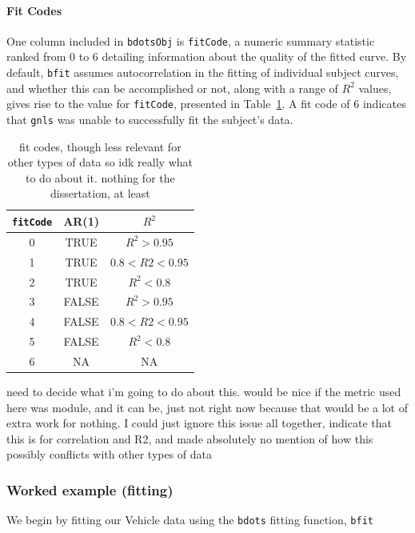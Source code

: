 \documentclass{article}
\newcommand{\xt}{\texttt}%
\begin{document}
\paragraph{Fit Codes}

One column included in \xt{bdotsObj} is \xt{fitCode}, a numeric summary statistic ranked from 0 to 6 detailing information about the quality of the fitted curve. By default, \xt{bfit} assumes autocorrelation in the fitting of individual subject curves, and whether this can be accomplished or not, along with a range of $R^2$ values, gives rise to the value for \xt{fitCode}, presented in Table~\ref{tab:fit_codes}. A fit code of 6 indicates that \xt{gnls} was unable to successfully fit the subject's data. 

\begin{table}[h]
\centering
\def\arraystretch{1.5}
\begin{tabular}{|c|c|c|}
\hline
\xt{fitCode} & AR(1) & $R^2$ \\
\hline
0 & TRUE & $R^2 > 0.95$ \\
1 & TRUE & $0.8 < R2 < 0.95$ \\
2 & TRUE & $ R^2 <0.8$ \\
3 & FALSE & $R^2 >0.95$ \\
4 & FALSE & $0.8 < R2 < 0.95$ \\
5 & FALSE &$ R^2 <0.8$  \\
6 & NA & NA \\
\hline
\end{tabular}
\caption{fit codes, though less relevant for other types of data so idk really what to do about it. nothing for the dissertation, at least}
\label{tab:fit_codes}
\end{table}



need to decide what i'm going to do about this. would be nice if the metric used here was module, and it can be, just not right now because that would be a lot of extra work for nothing. I could just ignore this issue all together, indicate that this is for correlation and R2, and made absolutely no mention of how this possibly conflicts with other types of data

\subsubsection{Worked example (fitting)} 

We begin by fitting our Vehicle data using the \xt{bdots} fitting function, \xt{bfit}
\end{document}
